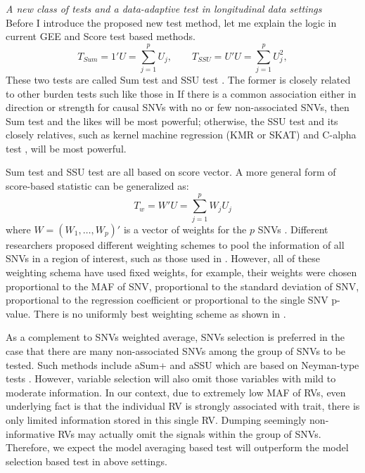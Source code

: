\documentclass[12pt]{article}
\begin{document}
\textit{A new class of tests and a data-adaptive test in longitudinal data settings}\\
Before I introduce the proposed new test method, let me explain the logic in current GEE and Score test based methods.
$$
T_{Sum} = 1' U = \sum_{j=1}^p U_j, \qquad T_{SSU} = U'U = \sum_{j=1}^p U_j^2,
$$
These two tests are called Sum test and SSU test \cite{Pan2009}. The former is closely related to other burden tests such like those in \cite{Morgenthaler2007,Li2008,Madsen2009} If there is a common association either in direction or strength for causal SNVs with no or few non-associated SNVs, then Sum test and the likes will be most powerful; otherwise, the SSU test and its closely relatives, such as kernel machine regression (KMR or SKAT) \cite{Lee2012,Ionita-Laza2013,Oualkacha2013,Lee2012a,Wu2011} and C-alpha test \cite{Neale2011}, will be most powerful. 

Sum test and SSU test are all based on score vector. A more general form of score-based statistic can be generalized as:
$$
T_w = W' U = \sum_{j=1}^p W_j U_j
$$
where $W = (W_1, \ldots, W_p)'$ is a vector of weights for the $p$ SNVs \cite{Lin2011}. Different researchers proposed different weighting schemes to pool the information of all SNVs in a region of interest, such as those used in \cite{Madsen2009,Sul2011,Pan2011,Han2010,Li2008,Zhang2011,Lin2011,Basu2011}. However, all of these weighting schema have used fixed weights, for example, their weights were chosen proportional to the MAF of SNV, proportional to the standard deviation of SNV, proportional to the regression coefficient or proportional to the single SNV p-value. There is no uniformly best weighting scheme as shown in \cite{pan2014powerful,Basu2011,Pan2011}. 

As a complement to SNVs weighted average, SNVs selection is preferred in the case that there are many non-associated SNVs among the group of SNVs to be tested. Such methods include aSum+ and aSSU which are based on Neyman-type tests \cite{Neyman1937}. However, variable selection will also omit those variables with mild to moderate information. In our context, due to extremely low MAF of RVs, even underlying fact is that the individual RV is strongly associated with trait, there is only limited information stored in this single RV. Dumping seemingly non-informative RVs may actually omit the signals within the group of SNVs. Therefore, we expect the model averaging based test will outperform the model selection based test in above settings.
\end{document}
